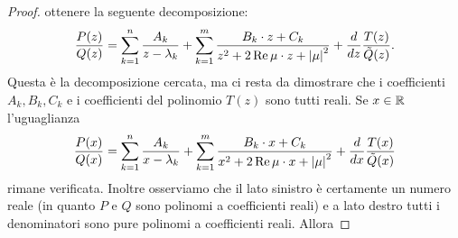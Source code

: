 \begin{proof}
ottenere la seguente decomposizione:
\[
 \frac{P(z)}{Q(z)}
 = \sum_{k=1}^n \frac{A_k}{z-\lambda_k}
 + \sum_{k=1}^m \frac{B_k \cdot z + C_k}{z^2+2\operatorname{Re} \mu \cdot z + {\left|\mu\right|}^2}
 + \frac{d}{dz} \frac{T(z)}{\tilde Q(z)}.
\]
Questa è la decomposizione cercata, ma ci resta da dimostrare
che i coefficienti $A_k, B_k, C_k$ e i coefficienti
del polinomio $T(z)$ sono tutti reali.
Se $x\in \mathbb R$ l'uguaglianza
\[
 \frac{P(x)}{Q(x)}
 = \sum_{k=1}^n \frac{A_k}{x-\lambda_k}
 + \sum_{k=1}^m \frac{B_k \cdot x + C_k}{x^2+2\operatorname{Re} \mu \cdot x + {\left|\mu\right|}^2}
 + \frac{d}{dx} \frac{T(x)}{\tilde Q(x)}
\]
rimane verificata.
Inoltre osserviamo che il lato sinistro
è certamente un numero reale (in quanto $P$ e $Q$ sono polinomi a coefficienti
reali) e a lato destro tutti i denominatori sono pure polinomi a coefficienti
reali. Allora

\end{proof}
%
